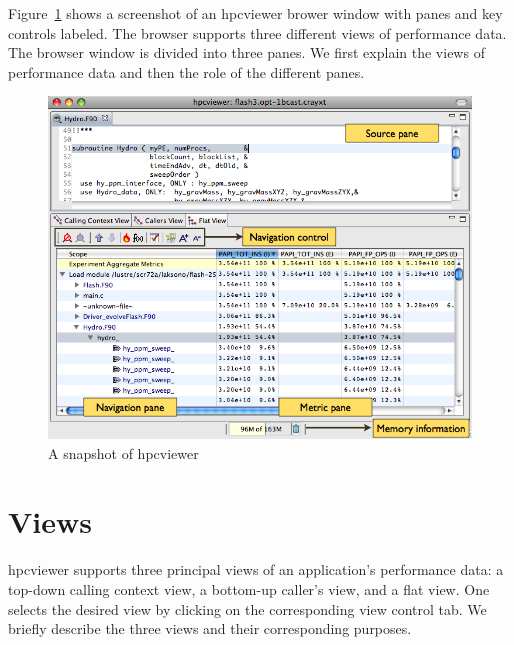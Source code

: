 \documentclass[a4paper,11pt]{article}
\begin{document}
 Figure~\ref{fig:hpcviewer} shows a screenshot of an hpcviewer brower window with  panes and key controls labeled. The browser supports three different views  of performance data. The browser window is divided into three panes. We  first explain the views of performance data and then the role of the different  panes.  

\begin{figure}
\begin{center}
\includegraphics[width=6.5in]{images/hpcviewer-legend.png}
\caption{A snapshot of hpcviewer} 
\label{fig:hpcviewer}
\end{center}
\end{figure}


\section{Views}

 hpcviewer supports three principal views of an application's performance data: a top-down calling context view, a bottom-up caller's view,  and a flat view. One selects the desired view by clicking on the corresponding  view control tab. We briefly describe the three views and their corresponding  purposes.  
\end{document}
